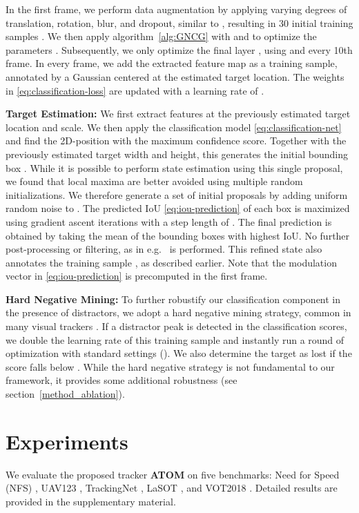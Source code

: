 \documentclass[10pt,twocolumn,letterpaper]{article}
\newcommand{\parsection}[1]{\noindent\textbf{#1:} }
\begin{document}
In the first frame, we perform data augmentation by applying varying degrees of translation, rotation, blur, and dropout, similar to \cite{BhatECCV2018}, resulting in 30 initial training samples . We then apply algorithm~\ref{alg:GNCG} with  and  to optimize the parameters . Subsequently, we only optimize the final layer , using  and  every 10th frame. In every frame, we add the extracted feature map  as a training sample, annotated by a Gaussian  centered at the estimated target location. The weights  in \eqref{eq:classification-loss} are updated with a learning rate of .

\parsection{Target Estimation}
We first extract features at the previously estimated target location and scale. We then apply the classification model \eqref{eq:classification-net} and find the 2D-position with the maximum confidence score. Together with the previously estimated target width and height, this generates the initial bounding box . While it is possible to perform state estimation using this single proposal, we found that local maxima are better avoided using multiple random initializations. We therefore generate a set of  initial proposals by adding uniform random noise to . The predicted IoU \eqref{eq:iou-prediction} of each box is maximized using  gradient ascent iterations with a step length of . The final prediction is obtained by taking the mean of the  bounding boxes with highest IoU. No further post-processing or filtering, as in e.g.\ \cite{SiamRPN} is performed. This refined state also annotates the training sample , as described earlier. Note that the modulation vector  in \eqref{eq:iou-prediction} is precomputed in the first frame.

\parsection{Hard Negative Mining}
To further robustify our classification component in the presence of distractors, we adopt a hard negative mining strategy, common in many visual trackers \cite{MDNet,DaSiamRPN}. If a distractor peak is detected in the classification scores, we double the learning rate of this training sample and instantly run a round of optimization with standard settings (). We also determine the target as lost if the score falls below . While the hard negative strategy is not fundamental to our framework, it provides some additional robustness (see section~\ref{method_ablation}). 
 \section{Experiments}

We evaluate the proposed tracker \textbf{ATOM} on five benchmarks: Need for Speed (NFS) \cite{NfS}, UAV123 \cite{UAV123}, TrackingNet \cite{TrackingNet}, LaSOT \cite{LaSOT}, and VOT2018 \cite{VOT2018}. Detailed results are provided in the supplementary material.
\end{document}

